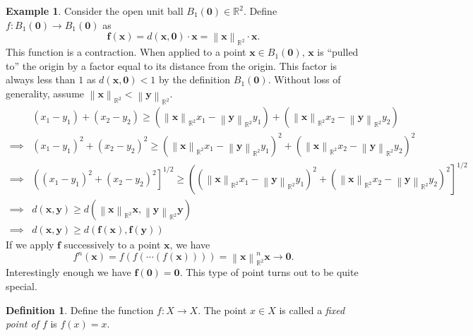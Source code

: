 \documentclass{article}
\newcommand{\R}{\mathbb{R}}
\newcommand{\x}{\mathbf{x}}
\newcommand{\f}{\mathbf{f}}
\newcommand{\y}{\mathbf{y}}
\newcommand{\ze}{\mathbf{0}}
\newcommand{\norm}[1]{\left\lVert#1\right\rVert}
\theoremstyle{definition}
\newtheorem{definition}{Definition}[section]
\newtheorem{example}{Example}[section]
\begin{document}
	\begin{example}
		Consider the open unit ball $B_1(\ze)\in \R^2 $. Define $ f: B_1(\ze)\to B_1(\ze) $ as $$\f(\x) = 
		d(\x,\ze)\cdot\x = \norm{\x}_{\R^2}\cdot \x .$$
		This function is a contraction. When applied to a point $ \x\in B_1(\ze)  $, $ \x $ is ``pulled to'' the origin by a factor equal to its distance from the origin. This factor is always less than $ 1 $ as $ d(\x,\ze) < 1$ by the definition $ B_1(\ze) $. Without loss of generality, assume $ \norm{\x}_{\R^2}  < \norm{\y}_{\R^2} $.
		\begin{align*}
			&(x_1-y_1) + (x_2-y_2)  \ge (\norm{\x}_{\R^2} x_1-\norm{\y}_{\R^2}y_1) + (\norm{\x}_{\R^2}x_2-\norm{\y}_{\R^2}y_2)\\ 
			\implies &	(x_1-y_1)^2 + (x_2-y_2)^2  \ge (\norm{\x}_{\R^2} x_1-\norm{\y}_{\R^2}y_1)^2 + (\norm{\x}_{\R^2}x_2-\norm{\y}_{\R^2}y_2)^2 \\
			\implies & \left((x_1-y_1)^2 + (x_2-y_2)^2 \right]^{1/2} \ge \left((\norm{\x}_{\R^2} x_1-\norm{\y}_{\R^2}y_1)^2 + (\norm{\x}_{\R^2}x_2-\norm{\y}_{\R^2}y_2)^2 \right]^{1/2}\\
			\implies & d(\x,\y) \ge d\left(\norm{\x}_{\R^2}\x, \norm{\y}_{\R^2}\y\right)\\
			\implies & d(\x,\y) \ge d\left(\f(\x), \f(\y)\right)
		\end{align*}
		If we apply $ \f $ successively to a point $ \x $, we have $$ f^n(\x) = f(f(\cdots(f(\x)))) = \norm{\x}_{\R^2}^n\x \to \ze.$$ 
		Interestingly enough we have $ \f(\ze) = \ze $. This type of point turns out to be quite special.
	\end{example}
	\begin{definition}\label{def9.6}
		Define the function $ f:X\to X $. The point $ x\in X $ is called a \textit{\color{red}fixed point of $ f $} is $ f(x)=x $. 
	\end{definition}
	
\end{document}
